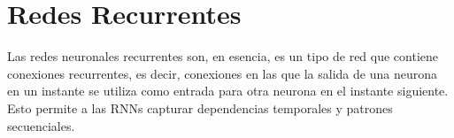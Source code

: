  \chapter{Redes Recurrentes}

 Las redes neuronales recurrentes son, en esencia, es un tipo de red que contiene conexiones recurrentes, es decir, conexiones en las que la salida de una neurona en un instante se utiliza como entrada para otra neurona en el instante siguiente. Esto permite a las RNNs capturar dependencias temporales y patrones secuenciales. 